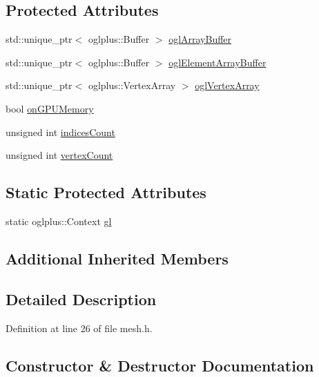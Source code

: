 \subsection*{Protected Attributes}
\begin{DoxyCompactItemize}
\item 
std\+::unique\+\_\+ptr$<$ oglplus\+::\+Buffer $>$ \hyperlink{class_o_g_l_mesh_add6dba0a9c25b3861ddb1dae4ce61dc0}{ogl\+Array\+Buffer}
\item 
std\+::unique\+\_\+ptr$<$ oglplus\+::\+Buffer $>$ \hyperlink{class_o_g_l_mesh_aa6ee45949ecaec113ad8062d1b601bec}{ogl\+Element\+Array\+Buffer}
\item 
std\+::unique\+\_\+ptr$<$ oglplus\+::\+Vertex\+Array $>$ \hyperlink{class_o_g_l_mesh_acf47aa123c36d1d06c2d71b13787b0e6}{ogl\+Vertex\+Array}
\item 
bool \hyperlink{class_o_g_l_mesh_aaa6cd7e62890961f6114d9753b7b3b58}{on\+G\+P\+U\+Memory}
\item 
unsigned int \hyperlink{class_o_g_l_mesh_a745e6b366f6323cbf0edd78aa76b868a}{indices\+Count}
\item 
unsigned int \hyperlink{class_o_g_l_mesh_a881b075268f51d438d4242d2380981ab}{vertex\+Count}
\end{DoxyCompactItemize}
\subsection*{Static Protected Attributes}
\begin{DoxyCompactItemize}
\item 
static oglplus\+::\+Context \hyperlink{class_o_g_l_mesh_ab63eb6d70cd8760e8aa2cb6833fe066b}{gl}
\end{DoxyCompactItemize}
\subsection*{Additional Inherited Members}


\subsection{Detailed Description}


Definition at line 26 of file mesh.\+h.



\subsection{Constructor \& Destructor Documentation}
\hypertarget{class_o_g_l_mesh_ab16637bce9f72105cbc661949926d4fd}{}
